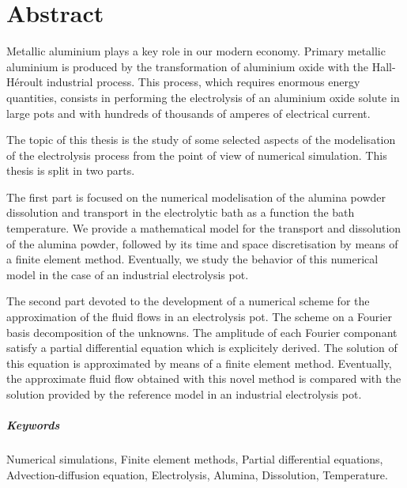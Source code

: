 \makeatletter
\@openrightfalse
\makeatother


\chapter*{Abstract}

Metallic aluminium plays a key role in our modern economy. Primary
metallic aluminium is produced by the transformation of aluminium
oxide with the Hall-Héroult industrial process. This process, which
requires enormous energy quantities, consists in performing the
electrolysis of an aluminium oxide solute in large pots and with
hundreds of thousands of amperes of electrical current.

The topic of this thesis is the study of some selected aspects of the
modelisation of the electrolysis process from the point of view of
numerical simulation. This thesis is split in two parts.

The first part is focused on the numerical modelisation of the alumina
powder dissolution and transport in the electrolytic bath as a
function the bath temperature. We provide a mathematical model for the
transport and dissolution of the alumina powder, followed by its time
and space discretisation by means of a finite element
method. Eventually, we study the behavior of this numerical model in
the case of an industrial electrolysis pot.

The second part devoted to the development of a numerical scheme for
the approximation of the fluid flows in an electrolysis pot. The
scheme on a Fourier basis decomposition of the unknowns. The amplitude
of each Fourier componant satisfy a partial differential equation
which is explicitely derived. The solution of this equation is
approximated by means of a finite element method. Eventually, the
approximate fluid flow obtained with this novel method is compared
with the solution provided by the reference model in an industrial
electrolysis pot.

\paragraph{Keywords}
Numerical simulations,
Finite element methods,
Partial differential equations,
Advection-diffusion equation,
Electrolysis,
Alumina,
Dissolution,
Temperature.


\makeatletter
\@openrighttrue
\makeatother
